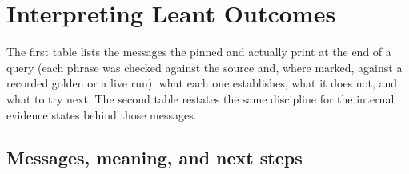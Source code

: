 \documentclass[10pt,letterpaper,oneside,openany]{report}
\newcommand{\term}[1]{\texttt{\detokenize{#1}}}
\begin{document}
\chapter{Interpreting Leant Outcomes}\label{app:outcomes}

The first table lists the messages the pinned  and  actually print at the end of a \term{:synth} query (each phrase was checked against the source and, where marked, against a recorded golden or a live run), what each one establishes, what it does not, and what to try next.  The second table restates the same discipline for the internal evidence states behind those messages.

\section*{Messages, meaning, and next steps}
\end{document}
